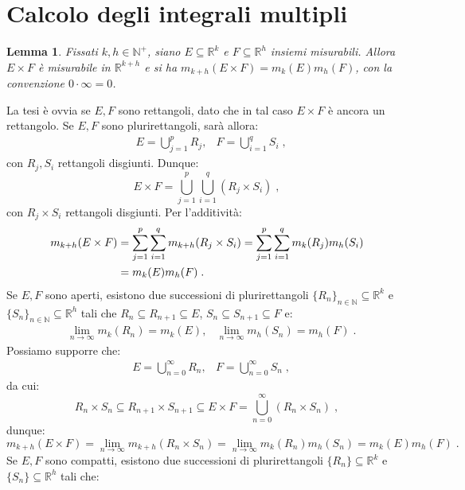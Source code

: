 \documentclass[a4paper,12pt]{report}
\theoremstyle{plain}
\newtheorem{lem}{Lemma}[section]
\theoremstyle{definition}
\theoremstyle{remark}
\numberwithin{equation}{section}
\begin{document}
\section{Calcolo degli integrali multipli}
\begin{lem} Fissati $k,h\in \mathbb{N}^+$, siano $E\subseteq \mathbb{R}^k$ e $F\subseteq\mathbb{R}^h$ insiemi misurabili. Allora $E\times F$ è misurabile in $\mathbb{R}^{k+h}$ e si ha $m_{k+h}(E\times F)=m_k(E)m_h(F)$, con la convenzione $0\cdot\infty=0$.
\end{lem}
\proof La tesi è ovvia se $E,F$ sono rettangoli, dato che in tal caso $E\times F$ è ancora un rettangolo. Se $E,F$ sono plurirettangoli, sarà 
allora:
\begin{align}
&E=\bigcup_{j=1}^p R_j, &F=\bigcup_{i=1}^q S_i\;,
\end{align}
con $R_j,S_i$ rettangoli disgiunti. Dunque:
\begin{equation}
E\times F=\bigcup_{j=1}^p\bigcup_{i=1}^q (R_j\times S_i)\;,
\end{equation}
con $R_j\times S_i$ rettangoli disgiunti. Per l'additività:
\begin{align}
m_{k+h}(E\times F) &=\sum_{j=1}^p\sum_{i=1}^q m_{k+h}(R_j\times S_i)=\sum_{j=1}^p\sum_{i=1}^q m_k(R_j)m_h(S_i) \notag \\
&=m_k(E)m_h(F)\;.
\end{align}
Se $E,F$ sono aperti, esistono due successioni di plurirettangoli $\{R_n\}_{n\in\mathbb{N}}\subseteq \mathbb{R}^k$ e $\{S_n\}_{n\in
\mathbb{N}}\subseteq \mathbb{R}^h$ tali che $R_n\subseteq R_{n+1}\subseteq E$, $S_n\subseteq S_{n+1}\subseteq F$ e:
\begin{align}
&\lim_{n\to\infty} m_k(R_n)=m_k(E), &\lim_{n\to\infty} m_h(S_n)=m_h(F)\;.
\end{align}
Possiamo supporre che:
\begin{align}
&E=\bigcup_{n=0}^{\infty} R_n, &F=\bigcup_{n=0}^{\infty} S_n\;,
\end{align}
da cui:
\begin{equation}
R_n\times S_n\subseteq R_{n+1}\times S_{n+1}\subseteq E\times F=\bigcup_{n=0}^{\infty}(R_n\times S_n)\;,
\end{equation}
dunque:
\begin{equation}
m_{k+h}(E\times F)=\lim_{n\to\infty} m_{k+h}(R_n\times S_n)=\lim_{n\to\infty} m_k(R_n)m_h(S_n)=m_k(E)m_h(F)\;.
\end{equation}
Se $E,F$ sono compatti, esistono due successioni di plurirettangoli $\{R_n\}\subseteq \mathbb{R}^k$ e $\{S_n\}\subseteq \mathbb{R}^h$ tali che:
\end{document}
